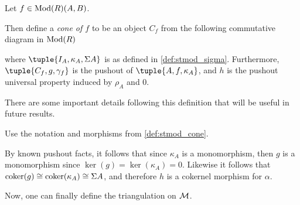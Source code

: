 \begin{definition}
    \label{def:stmod_cone}
    Let \( f \in \operatorname{Mod}(R)(A, B) \).
    
    Then define a \emph{cone of \( f \)} to be an object \( C_f \) from the following commutative diagram in \( \operatorname{Mod}(R) \)
    \begin{center}
    \end{center}
    where \( \tuple{I_A, \kappa_A, \Sigma A} \) is as defined in \autoref{def:stmod_sigma}. Furthermore, \( \tuple{C_f, g, \gamma_f} \) is the pushout of \( \tuple{A, f, \kappa_A} \), and \( h \) is the pushout universal property induced by \( \rho_A \) and \( 0 \).
\end{definition}

There are some important details following this definition that will be useful in future results.

\begin{remark}
    \label{rem:stmod_cone_pushout_properties}
    Use the notation and morphisms from \autoref{def:stmod_cone}.

    By known pushout facts, it follows that since \( \kappa_A \) is a monomorphism, then \( g \) is a monomorphism since \( \ker(g) = \ker(\kappa_A) = 0 \). Likewise it follows that \( \operatorname{coker}(g) \cong \operatorname{coker}(\kappa_A) \cong \Sigma A \), and therefore \( h \) is a cokernel morphism for \( \alpha \).
\end{remark}

Now, one can finally define the triangulation on \( {\mathcal{M}} \).

